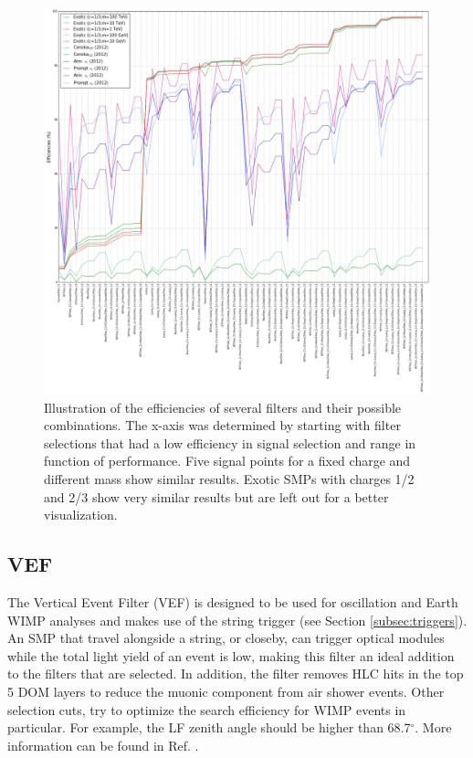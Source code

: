 \begin{figure}
\centering
\includegraphics[width=\textwidth]{chapter8/img/FilterRate.png}
\caption{Illustration of the efficiencies of several filters and their possible combinations. The x-axis was determined by starting with filter selections that had a low efficiency in signal selection and range in function of performance. Five signal points for a fixed charge and different mass show similar results. Exotic SMPs with charges 1/2 and 2/3 show very similar results but are left out for a better visualization.}
\label{fig:filterrate}
\end{figure}

\subsection{VEF}
The Vertical Event Filter (VEF) is designed to be used for oscillation and Earth WIMP analyses and makes use of the string trigger (see Section \ref{subsec:triggers}). An SMP that travel alongside a string, or closeby, can trigger optical modules while the total light yield of an event is low, making this filter an ideal addition to the filters that are selected. In addition, the filter removes HLC hits in the top 5 DOM layers to reduce the muonic component from air shower events. Other selection cuts, try to optimize the search efficiency for WIMP events in particular. For example, the LF zenith angle should be higher than 68.7$^\circ$. More information can be found in Ref. \cite{VEF2012}.

